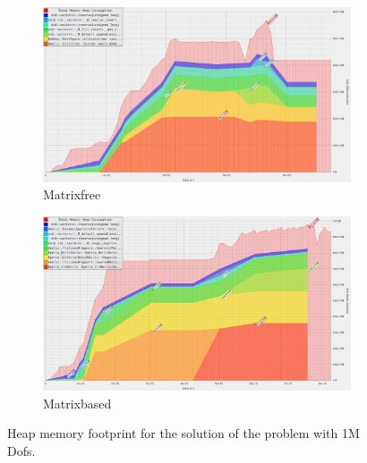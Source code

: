 \begin{figure}[h!]
     \centering
     \begin{subfigure}[h]{0.47\textwidth}
         \centering
         \includegraphics[width=\textwidth]{figure/massif-mf.png}
         \caption{Matrixfree}
     \end{subfigure}
     \hspace*{-0.2cm}
     \begin{subfigure}[h]{0.47\textwidth}
         \centering
         \includegraphics[width=\textwidth]{figure/massif-mg.png}
         \caption{Matrixbased}
     \end{subfigure}
     \caption{Heap memory footprint for the solution of the problem with 1M Dofs.}
     \label{fig:mem_foot}
\end{figure}
